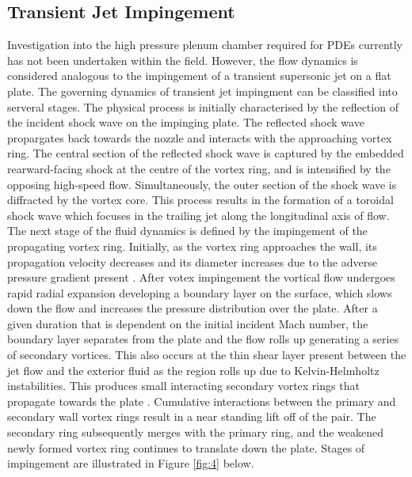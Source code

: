 \subsection{Transient Jet Impingement}
Investigation into the high pressure plenum chamber required for PDEs currently has not been undertaken within the field. However, the flow dynamics is considered analogous to the impingement of a transient supersonic jet on a flat plate. The governing dynamics of transient jet impingment can be classified into serveral stages. The physical process is initially characterised by the reflection of the incident shock wave on the impinging plate. The reflected shock wave propargates back towards the nozzle and interacts with the approaching vortex ring. The central section of the reflected shock wave is captured by the embedded rearward-facing shock at the centre of the vortex ring, and is intensified by the opposing high-speed flow. Simultaneously, the outer section of the shock wave is diffracted by the vortex core. This process results in the formation of a toroidal shock wave which focuses in the trailing jet along the longitudinal axis of flow. The next stage of the fluid dynamics is defined by the impingement of the propagating vortex ring. Initially, as the vortex ring approaches the wall, its propagation velocity decreases and its diameter increases due to the adverse pressure gradient present \cite{szumowski2000starting}. After votex impingement the vortical flow undergoes rapid radial expansion developing a boundary layer on the surface, which slows down the flow and increases the pressure distribution over the plate. After a given duration that is dependent on the initial incident Mach number, the boundary layer separates from the plate and the flow rolls up generating a series of secondary vortices. This also occurs at the thin shear layer present between the jet flow and the exterior fluid as the region rolls up due to Kelvin-Helmholtz instabilities. This produces small interacting secondary vortex rings that propagate towards the plate \cite{minota1997shock}. Cumulative interactions between the primary and secondary wall vortex rings result in a near standing lift off of the pair. The secondary ring subsequently merges with the primary ring, and the weakened newly formed vortex ring continues to translate down the plate. Stages of impingement are illustrated in Figure \ref{fig:4} below.

